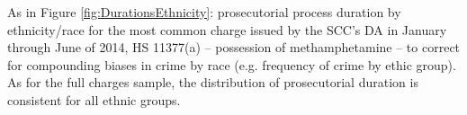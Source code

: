 As in Figure \ref{fig:DurationsEthnicity}: prosecutorial process duration by ethnicity/race for the most common charge issued by the SCC's DA in January through June of 2014, HS 11377(a) -- possession of methamphetamine -- to correct for compounding biases in crime by race (e.g. frequency of crime by ethic group). As for the full charges sample, the distribution of prosecutorial duration is consistent for all ethnic groups.
\label{fig:DurationsMeth}